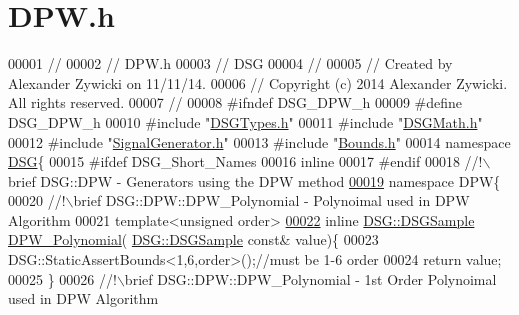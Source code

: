 \hypertarget{_d_p_w_8h_source}{\section{D\+P\+W.\+h}
\label{_d_p_w_8h_source}
}

\begin{DoxyCode}
00001 \textcolor{comment}{//}
00002 \textcolor{comment}{//  DPW.h}
00003 \textcolor{comment}{//  DSG}
00004 \textcolor{comment}{//}
00005 \textcolor{comment}{//  Created by Alexander Zywicki on 11/11/14.}
00006 \textcolor{comment}{//  Copyright (c) 2014 Alexander Zywicki. All rights reserved.}
00007 \textcolor{comment}{//}
00008 \textcolor{preprocessor}{#ifndef DSG\_DPW\_h}
00009 \textcolor{preprocessor}{#define DSG\_DPW\_h}
00010 \textcolor{preprocessor}{#include "\hyperlink{_d_s_g_types_8h}{DSGTypes.h}"}
00011 \textcolor{preprocessor}{#include "\hyperlink{_d_s_g_math_8h}{DSGMath.h}"}
00012 \textcolor{preprocessor}{#include "\hyperlink{_signal_generator_8h}{SignalGenerator.h}"}
00013 \textcolor{preprocessor}{#include "\hyperlink{_bounds_8h}{Bounds.h}"}
00014 \textcolor{keyword}{namespace }\hyperlink{namespace_d_s_g}{DSG}\{
00015 \textcolor{preprocessor}{#ifdef DSG\_Short\_Names}
00016     \textcolor{keyword}{inline}
00017 \textcolor{preprocessor}{#endif}
00018 \textcolor{comment}{    //!\(\backslash\)brief DSG::DPW - Generators using the DPW method}
\hypertarget{_d_p_w_8h_source_l00019}{}\hyperlink{namespace_d_s_g_1_1_d_p_w}{00019} \textcolor{comment}{}    \textcolor{keyword}{namespace }DPW\{\textcolor{comment}{}
00020 \textcolor{comment}{        //!\(\backslash\)brief DSG::DPW::DPW\_Polynomial - Polynoimal used in DPW Algorithm}
00021 \textcolor{comment}{}        \textcolor{keyword}{template}<\textcolor{keywordtype}{unsigned} order>
\hypertarget{_d_p_w_8h_source_l00022}{}\hyperlink{namespace_d_s_g_1_1_d_p_w_a1677c6fedac376f3e9b284bc9a4a227c}{00022}         \textcolor{keyword}{inline} \hyperlink{namespace_d_s_g_ac39a94cd27ebcd9c1e7502d0c624894a}{DSG::DSGSample} \hyperlink{namespace_d_s_g_1_1_d_p_w_a1677c6fedac376f3e9b284bc9a4a227c}{DPW\_Polynomial}(
      \hyperlink{namespace_d_s_g_ac39a94cd27ebcd9c1e7502d0c624894a}{DSG::DSGSample} \textcolor{keyword}{const}& value)\{
00023             DSG::StaticAssertBounds<1,6,order>();\textcolor{comment}{//must be 1-6 order}
00024             \textcolor{keywordflow}{return} value;
00025         \}\textcolor{comment}{}
00026 \textcolor{comment}{        //!\(\backslash\)brief DSG::DPW::DPW\_Polynomial - 1st Order Polynoimal used in DPW Algorithm}

\end{DoxyCode}

